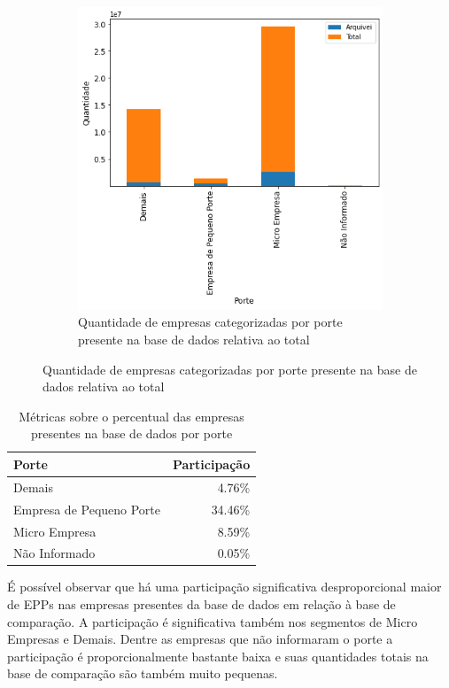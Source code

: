 \begin{figure}[htb]
\begin{subfigure}[b]{0.45\textwidth}
        \includegraphics[scale=0.45]{images/base-de-dados-4.2-qtde-por-porte.png}
        \caption{Quantidade de empresas categorizadas por porte presente na base de dados relativa ao total}
        \label{fig:base-de-dados:descritiva-4.2-qtde-por-porte}
    \end{subfigure}
    \fdadospesquisa
\end{figure}

\begin{table}[htb]
\centering
\caption{Métricas sobre o percentual das empresas presentes na base de dados por porte}
\label{tab:participacao-por-porte}
\begin{tabular}{lr}
\toprule
Porte & Participação \\
\midrule
Demais                   &    4.76\% \\
Empresa de Pequeno Porte &    34.46\% \\
Micro Empresa            &    8.59\% \\
Não Informado            &    0.05\% \\
\bottomrule
\end{tabular}
\fdadospesquisa
\end{table}

É possível observar que há uma participação significativa desproporcional maior de EPPs nas empresas presentes da base de dados em relação à base de comparação. A participação é significativa também nos segmentos de Micro Empresas e Demais. Dentre as empresas que não informaram o porte a participação é proporcionalmente bastante baixa e suas quantidades totais na base de comparação são também muito pequenas.

